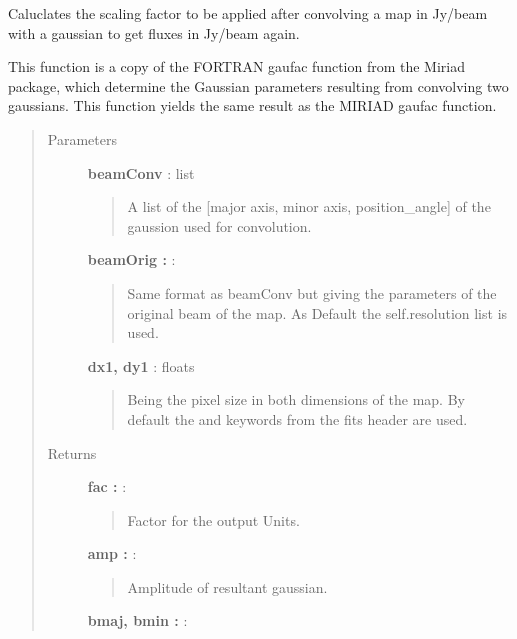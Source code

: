 \documentclass[a4paper,10pt,english]{sphinxmanual}
\begin{document}
\begin{fulllineitems}
\begin{fulllineitems}
\end{fulllineitems}


\begin{fulllineitems}
\label{maps:astrolyze.maps.fits.FitsMap.gauss_factor}
Caluclates the scaling factor to be applied after convolving
a map in Jy/beam with a gaussian to get fluxes in Jy/beam again.

This function is a copy of the FORTRAN gaufac function from the Miriad
package, which determine the Gaussian parameters resulting from
convolving two gaussians. This function yields the same result as
the MIRIAD gaufac function.
\begin{quote}\begin{description}
\item[{Parameters }] \leavevmode
\textbf{beamConv} : list
\begin{quote}

A list of the {[}major axis, minor axis, position\_angle{]}
of the gaussion used for convolution.
\end{quote}

\textbf{beamOrig :} :
\begin{quote}

Same format as beamConv but giving the parameters of the original
beam of the map. As Default the self.resolution list is used.
\end{quote}

\textbf{dx1, dy1} : floats
\begin{quote}

Being the pixel size in both dimensions of the map.
By default the  and  keywords from the
fits header are used.
\end{quote}

\item[{Returns }] \leavevmode
\textbf{fac :} :
\begin{quote}

Factor for the output Units.
\end{quote}

\textbf{amp :} :
\begin{quote}

Amplitude of resultant gaussian.
\end{quote}

\textbf{bmaj, bmin :} :
\begin{quote}


\end{quote}
\end{description}
\end{quote}
\end{fulllineitems}
\end{fulllineitems}
\end{document}
